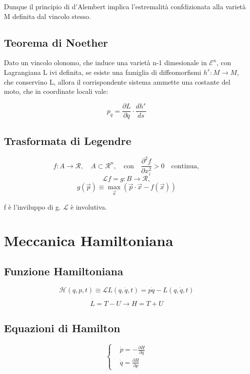\documentclass{article}
\begin{document}
Dunque il principio di d'Alembert implica l'estremalità confdizionata alla varietà M definita dal vincolo stesso.

\subsection{Teorema di Noether}
Dato un vincolo olonomo, che induce una varietà n-1 dimesionale in $\mathcal{E}^n$, con Lagrangiana L ivi definita, se esiste una famiglia di diffeomorfismi $h^s: M\rightarrow M$, che conservino L, allora il corrispondente sistema ammette una costante del moto, che in coordinate locali vale:

\begin{equation}
    p_q= \frac{\partial L}{\partial \dot q}\cdot \frac{d h^s}{ds}
\end{equation}

\subsection{Trasformata di Legendre}

\[
f: A \rightarrow \mathcal{R}, \quad A \subset \mathcal{R}^n, \quad \text{con} \quad \frac{\partial ^2 f}{\partial x_i^2}>0 \quad \text{continua},
\]
\[
\mathcal{L}f = g: B \rightarrow \mathcal{R},
\]
\[
g(\vec{p}) \equiv \max_{\vec{x}} (\vec{p} \cdot \vec{x} - f(\vec{x}))
\]

f è l'inviluppo di g.
$\mathcal{L}$ è involutiva.


\section{Meccanica Hamiltoniana}

\subsection{Funzione Hamiltoniana}

\begin{equation}
    \mathcal{H}(q,p, t)\equiv \mathcal{L}L(q,\dot q, t)= p\dot q- L(q,\dot q, t)
\end{equation}

\begin{equation}
    L=T-U \rightarrow H= T+U
\end{equation}

\subsection{Equazioni di Hamilton}
\begin{equation}
\left\{
\begin{aligned}
    & \dot p=-\frac{\partial H}{\partial q} \\
    & \dot q= \frac{\partial H}{\partial p}
\end{aligned}
\right.
\end{equation}
\end{document}
